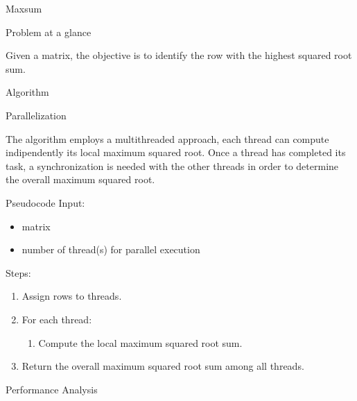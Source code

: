 \begin{chapter}{Maxsum}
    \begin{section}{Problem at a glance}
        \par Given a matrix, the objective is to identify the row with the highest squared root sum.
    \end{section}
    \begin{section}{Algorithm}
        \begin{subsection}{Parallelization}
            \par The algorithm employs a multithreaded approach, each thread can compute indipendently its local maximum squared root. Once a thread has completed its task, a synchronization is needed with the other threads in order to determine the overall maximum squared root.
        \end{subsection}
        \begin{subsection}{Pseudocode}
            Input:
            \begin{itemize}
                \item matrix
                \item number of thread(s) for parallel execution
            \end{itemize}
            Steps:
            \begin{enumerate}
                \item Assign rows to threads.
                \item For each thread:
                \begin{enumerate}
                    \item Compute the local maximum squared root sum.
                \end{enumerate}
                \item Return the overall maximum squared root sum among all threads.
            \end{enumerate}
            
        \end{subsection}
        \clearpage
        \begin{subsection}{Performance Analysis}
            \begin{figure}[ht]
                \centering
                
                \label{fig:maxsum-exectime}
            \end{figure}
            \begin{figure}[ht]
                \centering
                
                \label{fig:maxsum-speedup}
            \end{figure}
            \begin{figure}[ht]
                \centering
                
                \label{fig:maxsum-efficiency}
            \end{figure}
        \end{subsection}
    \end{section}
\end{chapter}